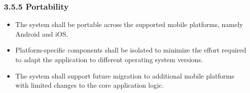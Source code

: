 \subsubsection{3.5.5 Portability}
\begin{itemize}
    \item The system shall be portable across the supported mobile platforms, namely Android and iOS.
    
    \item Platform-specific components shall be isolated to minimize the effort required to adapt the application to different operating system versions.
    
    \item The system shall support future migration to additional mobile platforms with limited changes to the core application logic.
\end{itemize}



